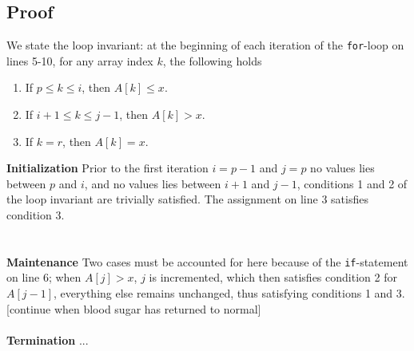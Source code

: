 \subsection{Proof}
We state the loop invariant: at the beginning of each iteration of the
\texttt{for}-loop on lines 5-10, for any array index $k$, the following
holds
\begin{enumerate}
	\item If $p \leq k \leq i$, then $A[k] \leq x$.
	\item If $i + 1 \leq k \leq j - 1$, then $A[k] > x$.
	\item If $k = r$, then $A[k] = x$.
\end{enumerate}
\noindent \textbf{Initialization} Prior to the first iteration $i = p - 1$ and
$j = p$ no values lies between $p$ and $i$, and no values lies between $i + 1$
and $j - 1$, conditions 1 and 2 of the loop invariant are trivially
satisfied. The assignment on line 3 satisfies condition 3. \\
\\\\
\noindent \textbf{Maintenance} Two cases must be accounted for here because of
the \texttt{if}-statement on line 6; when $A[j] > x$, $j$ is incremented,
which then satisfies condition 2 for $A[j - 1]$, everything else remains
unchanged, thus satisfying conditions 1 and 3. [continue when blood sugar has
returned to normal]
\\\\
\noindent \textbf{Termination} ...

